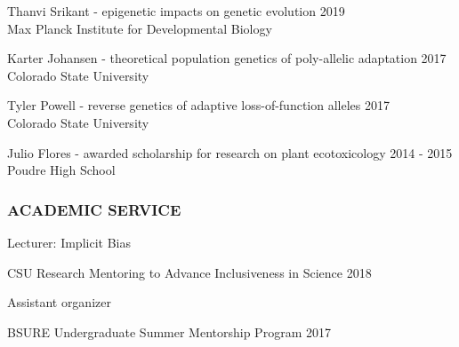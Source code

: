 \documentclass[12pt,english]{article}
\begin{document}
\hspace*{1.0em} Thanvi Srikant - epigenetic impacts on genetic evolution
\hfill
2019\\
\hspace*{2.0em} Max Planck Institute for Developmental Biology

\hspace*{1.0em} Karter Johansen -  theoretical population genetics of poly-allelic adaptation
\hfill
2017\\
\hspace*{2.0em} Colorado State University

\hspace*{1.0em} Tyler Powell - reverse genetics of adaptive loss-of-function alleles
\hfill
2017\\
\hspace*{2.0em} Colorado State University

\hspace*{1.0em} Julio Flores - awarded scholarship for research on plant ecotoxicology
\hfill
2014 - 2015\\
\hspace*{2.0em} Poudre High School

\subsubsection*{ACADEMIC SERVICE}
\vspace{-0.5ex}\par

\hspace*{1.0em} Lecturer: Implicit Bias
\par
\hspace*{2.0em} CSU Research Mentoring to Advance Inclusiveness in Science
\hfill
2018

\hspace*{1.0em} Assistant organizer
\par
\hspace*{2.0em} BSURE Undergraduate Summer Mentorship Program
\hfill
2017
\end{document}

